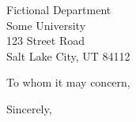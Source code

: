 \documentclass[12pt,a4paper]{letter}
\date{\today}
\begin{document}
\pagestyle{plain}
\begin{letter}{ Fictional Department\\
Some University\\
    123 Street Road\\ Salt Lake City, UT 84112}

\opening{To whom it may concern,}

\lipsum[1-3]

\closing{Sincerely,}
\end{letter}
\end{document}
